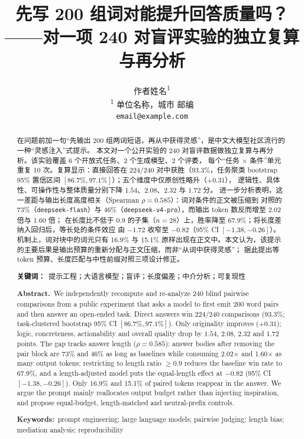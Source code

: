 \documentclass[UTF8,11pt,a4paper]{ctexart}
\title{\heiti 先写 200 组词对能提升回答质量吗？\\[4pt]
\large ——对一项 240 对盲评实验的独立复算与再分析}
\author{作者姓名\textsuperscript{1}\\[3pt]
\small \textsuperscript{1} 单位名称，城市 邮编\\
\small \texttt{email@example.com}}
\date{}
\newcommand{\deepflash}{\texttt{deepseek-flash}}
\newcommand{\deeppro}{\texttt{deepseek-v4-pro}}
\begin{document}
\maketitle

\begin{abstract}
\noindent
在问题前加一句“先输出 200 组两词短语，再从中获得灵感”，是中文大模型社区流行的一种“灵感注入”式提示。
本文对一个公开实验的 240 对盲评数据做独立复算与再分析。该实验覆盖 6 个开放式任务、2 个生成模型、2 个评委，
每个“任务 $\times$ 条件”单元重复 10 次。复算显示：直接回答在 224/240 对中获胜（93.3\%，任务聚类
bootstrap 95\% 置信区间 $[86.7\%, 97.1\%]$）；五个维度中仅原创性略升（$+0.31$），
逻辑性、具体性、可操作性与整体质量分别下降 $1.54$、$2.08$、$2.32$ 与 $1.72$ 分。
进一步分析表明，这一差距与输出长度高度相关（Spearman $\rho=0.585$）：词对条件的正文被压缩到
对照的 73\%（\deepflash）与 46\%（\deeppro），而输出 token 数反而增至 2.02 倍与 1.60 倍；
在长度比不低于 0.9 的子集（$n=28$）上，胜率降至 67.9\%；将长度差纳入回归后，等长处的条件效应
由 $-1.72$ 收窄至 $-0.82$（95\% CI $[-1.38, -0.26]$）。机制上，词对块中的词元只有 16.9\% 与 15.1\%
原样出现在正文中。本文认为，该提示的主要后果是输出预算的重新分配与正文压缩，而非“从词中获得灵感”；
据此提出等 token 预算、长度匹配与中性前缀对照三项设计修正。

\vspace{0.6em}
\noindent\textbf{关键词：}\ 提示工程；大语言模型；盲评；长度偏差；中介分析；可复现性

\vspace{0.9em}
{\small
\noindent\textbf{Abstract.}\ We independently recompute and re-analyze 240 blind pairwise comparisons from a public
experiment that asks a model to first emit 200 word pairs and then answer an open-ended task. Direct answers win
224/240 comparisons (93.3\%; task-clustered bootstrap 95\% CI $[86.7\%, 97.1\%]$). Only originality improves
($+0.31$); logic, concreteness, actionability and overall quality drop by $1.54$, $2.08$, $2.32$ and $1.72$ points.
The gap tracks answer length ($\rho=0.585$): answer bodies after removing the pair block are 73\% and 46\% as long as baselines while consuming
2.02$\times$ and 1.60$\times$ as many output tokens; restricting to length ratio $\ge 0.9$ reduces the baseline win rate
to 67.9\%, and a length-adjusted model puts the equal-length effect at $-0.82$ (95\% CI $[-1.38,-0.26]$). Only
16.9\% and 15.1\% of paired tokens reappear in the answer. We argue the prompt mainly reallocates output budget
rather than injecting inspiration, and propose equal-budget, length-matched and neutral-prefix controls.

\noindent\textbf{Keywords:}\ prompt engineering; large language models; pairwise judging; length bias;
mediation analysis; reproducibility
}
\end{abstract}
\end{document}
